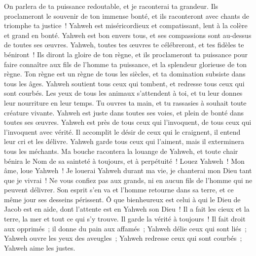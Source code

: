 \begin{multicols}{2}
 On parlera de ta puissance redoutable, et je raconterai ta grandeur.
 Ils proclameront le souvenir de ton immense bonté, et ils raconteront avec chants de triomphe ta justice~!
 Yahweh est miséricordieux et compatissant, lent à la colère et grand en bonté.
 Yahweh est bon envers tous, et ses compassions sont au-dessus de toutes ses œuvres.
 Yahweh, toutes tes œuvres te célébreront, et tes fidèles te béniront~!
 Ils diront la gloire de ton règne, et ils proclameront ta puissance
 pour faire connaître aux fils de l'homme ta puissance, et la splendeur glorieuse de ton règne.
 Ton règne est un règne de tous les siècles, et ta domination subsiste dans tous les âges.
 Yahweh soutient tous ceux qui tombent, et redresse tous ceux qui sont courbés.
 Les yeux de tous les animaux s'attendent à toi, et tu leur donnes leur nourriture en leur temps.
 Tu ouvres ta main, et tu rassasies à souhait toute créature vivante.
 Yahweh est juste dans toutes ses voies, et plein de bonté dans toutes ses œuvres.
 Yahweh est près de tous ceux qui l'invoquent, de tous ceux qui l'invoquent avec vérité.
 Il accomplit le désir de ceux qui le craignent, il entend leur cri et les délivre.
 Yahweh garde tous ceux qui l'aiment, mais il exterminera tous les méchants.
 Ma bouche racontera la louange de Yahweh, et toute chair bénira le Nom de sa sainteté à toujours, et à perpétuité~!
\VerseOne{}Louez Yahweh~! Mon âme, loue Yahweh~!
Je louerai Yahweh durant ma vie, je chanterai mon Dieu tant que je vivrai~!
Ne vous confiez pas aux grands, ni en aucun fils de l'homme qui ne peuvent délivrer.
Son esprit s'en va et l'homme retourne dans sa terre, et ce même jour ses desseins périssent.
Ô que bienheureux est celui à qui le Dieu de Jacob est en aide, dont l'attente est en Yahweh son Dieu~!
Il a fait les cieux et la terre, la mer et tout ce qui s'y trouve. Il garde la vérité à toujours~!
Il fait droit aux opprimés~; il donne du pain aux affamés~; Yahweh délie ceux qui sont liés~;
Yahweh ouvre les yeux des aveugles~; Yahweh redresse ceux qui sont courbés~; Yahweh aime les justes.

\end{multicols}
